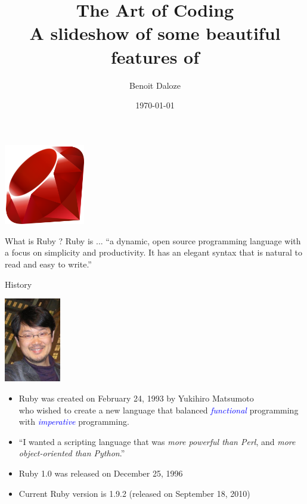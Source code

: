 \documentclass[10pt]{beamer}
\title[\Ruby : The Art of Coding]{The Art of Coding \\ A slideshow of some beautiful features of \Ruby}
\author{Benoit Daloze}
\date{\today}
\begin{document}
\begin{frame}
\titlepage
\includegraphics[width=100pt]{images/ruby.png}
\end{frame}


\begin{frame}{What is Ruby ?}
Ruby is ... ``a dynamic, open source programming language with a focus on simplicity and productivity. It has an elegant syntax that is natural to read and easy to write.''
\end{frame}

\begin{frame}{History}
\begin{center}
	\includegraphics[width=70pt]{images/matz.jpg}
\end{center}

\begin{itemize}
	\item Ruby was created on February 24, 1993 by Yukihiro Matsumoto\\
			who wished to create a new language that balanced \emph{\textcolor{blue}{functional}} programming with \emph{\textcolor{blue}{imperative}} programming.
	\item ``I wanted a scripting language that was \emph{more powerful than Perl}, and \emph{more object-oriented than Python}.''
	\item Ruby 1.0 was released on December 25, 1996
	\item Current Ruby version is 1.9.2 (released on September 18, 2010)
\end{itemize}
\end{frame}
\end{document}
